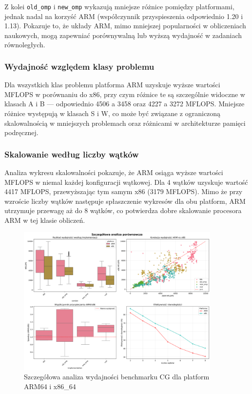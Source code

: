 Z kolei \texttt{old\_omp} i \texttt{new\_omp} wykazują mniejsze różnice pomiędzy platformami, jednak nadal na korzyść ARM (współczynnik przyspieszenia odpowiednio 1.20 i 1.13). Pokazuje to, że układy ARM, mimo mniejszej popularności w obliczeniach naukowych, mogą zapewniać porównywalną lub wyższą wydajność w zadaniach równoległych.
\subsubsection{Wydajność względem klasy problemu}
Dla wszystkich klas problemu platforma ARM uzyskuje wyższe wartości MFLOPS w porównaniu do x86, przy czym różnice te są szczególnie widoczne w klasach A i B — odpowiednio 4506 a 3458 oraz 4227 a 3272 MFLOPS. Mniejsze różnice występują w klasach S i W, co może być związane z ograniczoną skalowalnością w mniejszych problemach oraz różnicami w architekturze pamięci podręcznej.
\subsubsection{Skalowanie według liczby wątków}
Analiza wykresu skalowalności pokazuje, że ARM osiąga wyższe wartości MFLOPS w niemal każdej konfiguracji wątkowej. Dla 4 wątków uzyskuje wartość 4417 MFLOPS, przewyższając tym samym x86 (3179 MFLOPS). Mimo że przy wzroście liczby wątków następuje spłaszczenie wykresów dla obu platform, ARM utrzymuje przewagę aż do 8 wątków, co potwierdza dobre skalowanie procesora ARM w tej klasie obliczeń.

\begin{figure}[H]
    \centering
    \includegraphics[width=0.9\textwidth]{analiza/images/parallel/cg/compare/cg_szczegolowa_analiza_wydajnosci.png}
    \caption{Szczegółowa analiza wydajności benchmarku CG dla platform ARM64 i x86\_64}
    \label{cg_szczegolowa_analiza_wydajnosci}
\end{figure}
